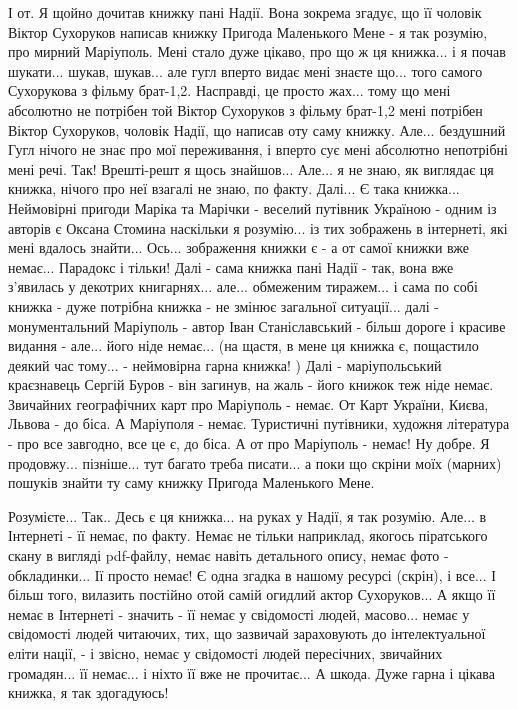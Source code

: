 І от. Я щойно дочитав книжку пані Надії. Вона зокрема згадує, що її чоловік Віктор Сухоруков написав книжку Пригода Маленького Мене - я так розумію, про мирний Маріуполь. Мені стало дуже цікаво, про що ж ця книжка... і я почав шукати... шукав, шукав... але гугл вперто видає мені знаєте що... того самого Сухорукова з фільму брат-1,2. Насправді, це просто жах... тому що мені абсолютно не потрібен той Віктор Сухоруков з фільму брат-1,2 мені потрібен Віктор Сухоруков, чоловік Надії, що написав оту саму книжку.  Але... бездушний Гугл нічого не знає про мої переживання, і вперто сує мені абсолютно непотрібні мені речі. Так! Врешті-решт я щось знайшов... Але... я не знаю, як виглядає ця книжка, нічого про неї взагалі не знаю, по факту. Далі... Є така книжка... Неймовірні пригоди Маріка та Марічки - веселий путівник Україною - одним із авторів є Оксана Стомина наскільки я розумію... із тих зображень в інтернеті, які мені вдалось знайти... Ось... зображення книжки є - а от самої книжки вже немає... Парадокс і тільки! Далі - сама книжка пані Надії - так, вона вже з'явилась у декотрих книгарнях... але... обмеженим тиражем... і сама по собі книжка - дуже потрібна книжка - не змінює загальної ситуації... далі - монументальний Маріуполь - автор Іван Станіславський - більш дороге і красиве видання - але... його ніде немає... (на щастя, в мене ця книжка є, пощастило деякий час тому... - неймовірна гарна книжка! ) Далі - маріупольський краєзнавець Сергій Буров - він загинув, на жаль - його книжок теж ніде немає. Звичайних географічних карт про Маріуполь - немає. От Карт України, Києва, Львова - до біса. А Маріуполя - немає. Туристичні путівники, художня література - про все завгодно, все це є, до біса. А от про Маріуполь - немає! Ну добре.
Я продовжу... пізніше... тут багато треба писати... а поки що скріни моїх (марних) пошуків знайти ту саму книжку Пригода Маленького Мене. 

Розумієте... Так.. Десь є ця книжка... на руках у Надії, я так розумію. Але... в Інтернеті - її немає, по факту. Немає не тільки наприклад, якогось піратського скану в вигляді pdf-файлу, немає навіть детального опису, немає фото - обкладинки... Ії просто немає! Є одна згадка в нашому ресурсі (скрін), і все... І більш того, вилазить постійно отой самій огидлий актор Сухоруков... А якщо її немає в Інтернеті - значить - її немає у свідомості людей, масово... немає у свідомості людей читаючих, тих, що зазвичай зараховують до інтелектуальної еліти нації, - і звісно, немає у свідомості людей пересічних, звичайних громадян... її немає... і ніхто її вже не прочитає... А шкода. Дуже гарна і цікава книжка, я так здогадуюсь!

